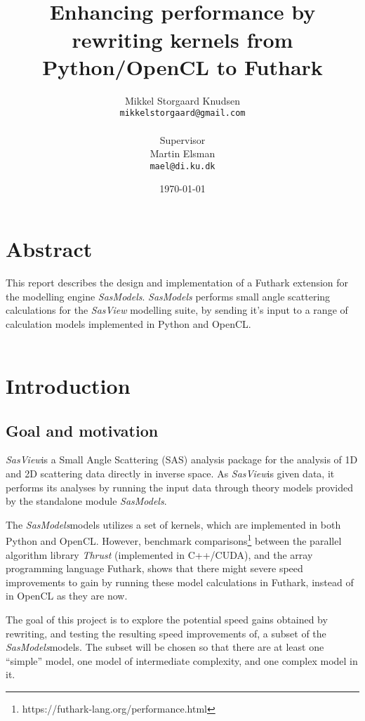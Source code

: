 \documentclass[11pt]{article}
\title{
  \vspace{3cm}
  \Huge{\futhark}\\
  \Large{Enhancing performance by rewriting kernels from Python/OpenCL to
    Futhark}
}
\author{
  \Large{Mikkel Storgaard Knudsen}\\
  \texttt{mikkelstorgaard@gmail.com}\\
  \\
  \Large{Supervisor}\\
  Martin Elsman\\
  \texttt{mael@di.ku.dk}
}
\date{
    \today
}
\def \ColourPDF {include/ku-farve}
\def \TitlePDF   {include/ku-en}  %
\newcommand{\sasmodels}{\textit{SasModels}}
\newcommand{\sasview}{\textit{SasView}}
\begin{document}


\clearpage\maketitle
\thispagestyle{empty}

\section*{Abstract}
This report describes the design and implementation of a Futhark extension for
the modelling engine \sasmodels.
\sasmodels{} performs small angle scattering calculations for the \sasview{}
modelling suite, by sending it's input to a range of calculation models
implemented in Python and OpenCL.\\\\





\newpage

\section{Introduction}
\subsection{Goal and motivation}
\sasview is a Small Angle Scattering (SAS) analysis package for the
analysis of 1D and 2D scattering data directly in inverse space.
As \sasview is given data, it performs its analyses by running the
input data through theory models provided by the standalone module
\sasmodels.

The \sasmodels models utilizes a set of kernels, which are implemented
in both Python and OpenCL. However, benchmark
comparisons\footnote{https://futhark-lang.org/performance.html}
between the parallel algorithm library \textit{Thrust}
(implemented in C++/CUDA), and the array programming language Futhark, shows
that there might severe speed improvements to gain by running these model
calculations in Futhark, instead of in OpenCL as they are now.

The goal of this project is to explore the potential speed gains obtained by
rewriting, and testing the resulting speed improvements of, a subset of the
\sasmodels models.
The subset will be chosen so that there are at least
one ``simple'' model, one model of intermediate complexity, and one complex
model in it.
\end{document}

